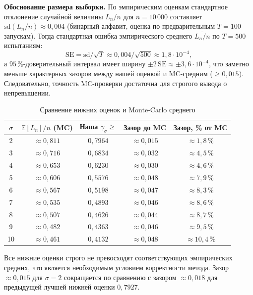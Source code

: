 \textbf{Обоснование размера выборки.} По эмпирическим оценкам стандартное отклонение случайной величины $L_n/n$ для $n = 10\,000$ составляет $\mathrm{sd}(L_n/n) \approx 0{,}004$ (бинарный алфавит, оценка по предварительным $T = 100$ запускам). Тогда стандартная ошибка эмпирического среднего $\overline{L_n/n}$ по $T = 500$ испытаниям:
\[
    \mathrm{SE} = \mathrm{sd}/\sqrt{T} \approx 0{,}004/\sqrt{500} \approx 1{,}8 \cdot 10^{-4},
\]
а $95\,\%$-доверительный интервал имеет ширину $\pm 2\,\mathrm{SE} \approx \pm 3{,}6 \cdot 10^{-4}$, что заметно меньше характерных зазоров между нашей оценкой и MC-средним ($\geq 0{,}015$). Следовательно, точность MC-проверки достаточна для строгого вывода о непревышении.

\begin{table}[h!]
\caption{Сравнение нижних оценок и Monte-Carlo среднего}
\label{tab:mc}
\centering
\small
\begin{tabular}{|c|c|c|c|c|}
\hline
$\sigma$ & $\mathbb{E}[L_n]/n$ (MC) & Наша $\gamma_\sigma \geq$ & Зазор до MC & Зазор, \% от MC \\
\hline
2  & $\approx 0{,}811$  & $0{,}7964$ & $\approx 0{,}015$ & $\approx 1{,}8\,\%$ \\
3  & $\approx 0{,}716$  & $0{,}6834$ & $\approx 0{,}032$ & $\approx 4{,}5\,\%$ \\
4  & $\approx 0{,}653$  & $0{,}6230$ & $\approx 0{,}030$ & $\approx 4{,}6\,\%$ \\
5  & $\approx 0{,}606$  & $0{,}5576$ & $\approx 0{,}048$ & $\approx 7{,}9\,\%$ \\
6  & $\approx 0{,}567$  & $0{,}5198$ & $\approx 0{,}047$ & $\approx 8{,}3\,\%$ \\
7  & $\approx 0{,}535$  & $0{,}4893$ & $\approx 0{,}046$ & $\approx 8{,}6\,\%$ \\
8  & $\approx 0{,}507$  & $0{,}4626$ & $\approx 0{,}044$ & $\approx 8{,}7\,\%$ \\
9  & $\approx 0{,}482$  & $0{,}4363$ & $\approx 0{,}046$ & $\approx 9{,}5\,\%$ \\
10 & $\approx 0{,}461$  & $0{,}4132$ & $\approx 0{,}048$ & $\approx 10{,}4\,\%$ \\
\hline
\end{tabular}
\end{table}

Все нижние оценки строго не превосходят соответствующих эмпирических средних, что является необходимым условием корректности метода. Зазор $\approx 0{,}015$ для $\sigma = 2$ сокращается по сравнению с зазором $\approx 0{,}018$ для предыдущей лучшей нижней оценки $0{,}7927$.

